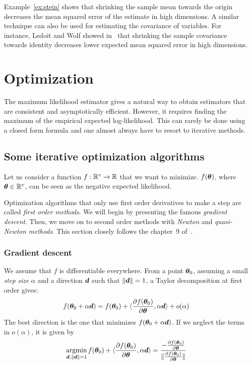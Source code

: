Example~\ref{ex:stein} shows that shrinking the sample mean towards the
origin decreases the mean squared error of the estimate in high dimensions. A similar technique can also be used for estimating the covariance of variables. For instance, Ledoit
and Wolf showed in~\cite{ledoit2004well} that shrinking the sample covariance
towards identity decreases lower expected mean squared error in high dimensions.

\section{Optimization}
\label{sec:optimintro}
The maximum likelihood estimator gives a natural way to obtain estimators that
are consistent and asymptotically efficient.
However, it requires finding the maximum of the empirical expected
log-likelihood.
This can rarely be done using a closed form formula and one almost always have
to resort to iterative methods.


\subsection{Some iterative optimization algorithms}
Let us consider a function $f: \mathbb{R}^v \rightarrow \mathbb{R}$ that we
want to minimize. $f(\boldsymbol{\theta})$, where $\boldsymbol{\theta} \in \mathbb{R}^v$, can be seen as the
negative expected likelihood.


Optimization algorithms that only use first order derivatives to make a step are
called \emph{first order methods}. We will begin by presenting the famous
\emph{gradient descent}. Then, we move on to second order methods with \emph{Newton} and
\emph{quasi-Newton methods}. This section closely follows the chapter~9 of~\cite{boyd2004convex}.

\subsubsection{Gradient descent}
\label{sec:gd}
We assume that $f$ is differentiable everywhere.
From a point $\boldsymbol{\theta}_0$, assuming a small \emph{step size} $\alpha$ and a direction
$\boldsymbol{d}$ such that $\|\boldsymbol{d}\| = 1$, a Taylor decomposition at first order gives:
\begin{align}
f(\boldsymbol{\theta}_0 + \alpha \boldsymbol{d}) = f(\boldsymbol{\theta}_0) + \langle{  \frac{ \partial f(\boldsymbol{\theta}_0)}{\partial \boldsymbol{\theta}}  },{ \alpha \boldsymbol{d} }\rangle + o(\alpha) 
\end{align}
The best direction is the one that minimizes $f(\boldsymbol{\theta}_0 + \alpha \boldsymbol{d})$. If we
neglect the terms in $o(\alpha)$, it is given by
\begin{align}
  \operatorname*{argmin}_{\boldsymbol{d}, \|\boldsymbol{d}\| = 1} f(\boldsymbol{\theta}_0) + \langle{  \frac{ \partial f(\boldsymbol{\theta}_0)}{\partial \boldsymbol{\theta}}  },{ \alpha \boldsymbol{d} }\rangle = \frac{-\frac{ \partial f(\boldsymbol{\theta}_0)}{\partial \boldsymbol{\theta}}}{\|\frac{ \partial f(\boldsymbol{\theta}_0)}{\partial \boldsymbol{\theta}}\|}
\end{align}

